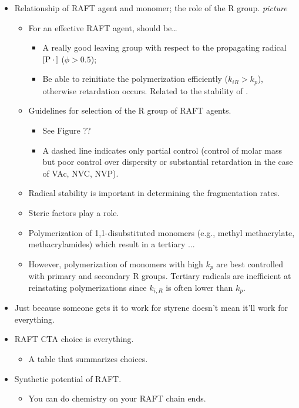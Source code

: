 \documentclass[../notes.tex]{subfiles}
\begin{document}
\begin{itemize}
    \item Relationship of RAFT agent and monomer; the role of the R group.
    \emph{picture}
    \begin{itemize}
        \item For an effective RAFT agent,  should be\dots
        \begin{itemize}
            \item A really good leaving group with respect to the propagating radical $[\ce{P*}]$ ($\phi>0.5$);
            \item Be able to reinitiate the polymerization efficiently ($k_{iR}>k_p$), otherwise retardation occurs. Related to the stability of .
        \end{itemize}
        \item Guidelines for selection of the R group of RAFT agents.
        \begin{itemize}
            \item See Figure ??
            \item A dashed line indicates only partial control (control of molar mass but poor control over dispersity or substantial retardation in the case of VAc, NVC, NVP).
        \end{itemize}
        \item Radical stability is important in determining the fragmentation rates.
        \item Steric factors play a role.
        \item Polymerization of 1,1-disubstituted monomers (e.g., methyl methacrylate, methacrylamides) which result in a tertiary ...
        \item However, polymerization of monomers with high $k_p$ are best controlled with primary and secondary R groups. Tertiary radicals are inefficient at reinstating polymerizations since $k_{i,R}$ is often lower than $k_p$.
    \end{itemize}
    \item Just because someone gets it to work for styrene doesn't mean it'll work for everything.
    \item RAFT CTA choice is everything.
    \begin{itemize}
        \item A table that summarizes choices.
    \end{itemize}
    \item Synthetic potential of RAFT.
    \begin{itemize}
        \item You can do chemistry on your RAFT chain ends.

\end{itemize}
\end{itemize}
\end{document}
